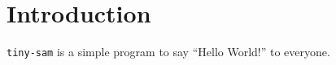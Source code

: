 \documentclass{article}
\begin{document}
\section{Introduction}
\texttt{tiny-sam} is a simple program to say ``Hello World!'' to everyone.
\end{document}

